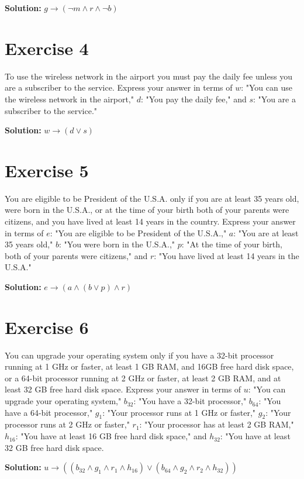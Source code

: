\documentclass{Axon}
\begin{document}
\noindent
\textbf{Solution:}
\(g \to (\lnot m \land r \land \lnot b)\)

\section*{Exercise 4}
To use the wireless network in the airport you must pay the daily fee unless you are a subscriber to the service. Express your answer in terms of \(w\): "You can use the wireless network in the airport," \(d\): "You pay the daily fee," and \(s\): "You are a subscriber to the service."

\noindent
\textbf{Solution:}
\(w \to (d \lor s)\)

\section*{Exercise 5}
You are eligible to be President of the U.S.A. only if you are at least 35 years old, were born in the U.S.A., or at the time of your birth both of your parents were citizens, and you have lived at least 14 years in the country. Express your answer in terms of \(e\): "You are eligible to be President of the U.S.A.," \(a\): "You are at least 35 years old," \(b\): "You were born in the U.S.A.," \(p\): "At the time of your birth, both of your parents were citizens," and \(r\): "You have lived at least 14 years in the U.S.A."

\noindent
\textbf{Solution:}
\(e \to (a \land (b \lor p) \land r)\)

\section*{Exercise 6}
You can upgrade your operating system only if you have a 32-bit processor running at 1 GHz or faster, at least 1 GB RAM, and 16GB free hard disk space, or a 64-bit processor running at 2 GHz or faster, at least 2 GB RAM, and at least 32 GB free hard disk space. Express your answer in terms of \(u\): "You can upgrade your operating system," \(b_{32}\): "You have a 32-bit processor," \(b_{64}\): "You have a 64-bit processor," \(g_1\): "Your processor runs at 1 GHz or faster," \(g_2\): "Your processor runs at 2 GHz or faster," \(r_1\): "Your processor has at least 2 GB RAM," \(h_{16}\): "You have at least 16 GB free hard disk space," and \(h_{32}\): "You have at least 32 GB free hard disk space.

\noindent
\textbf{Solution:}
\(u \to ((b_{32} \land g_1 \land r_1 \land h_{16}) \lor (b_{64} \land g_2\land r_2 \land h_{32}))\)
\end{document}
